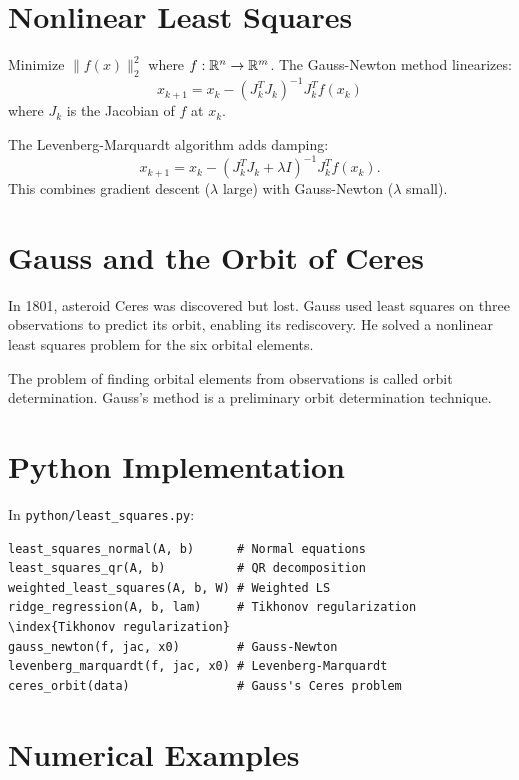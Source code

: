 \section{Nonlinear Least Squares}

Minimize $\|f(x)\|_2^2$ where $f: \mathbb{R}^n \to \mathbb{R}^m$. The Gauss-Newton method  linearizes:
\[
x_{k+1} = x_k - (J_k^T J_k)^{-1} J_k^T f(x_k)
\]
where $J_k$ is the Jacobian of $f$ at $x_k$.

The Levenberg-Marquardt algorithm  adds damping:
\[
x_{k+1} = x_k - (J_k^T J_k + \lambda I)^{-1} J_k^T f(x_k).
\]
This combines gradient descent ($\lambda$ large) with Gauss-Newton ($\lambda$ small).

\section{Gauss and the Orbit of Ceres}

In 1801, asteroid Ceres was discovered but lost. Gauss used least squares on three observations to predict its orbit, enabling its rediscovery. He solved a nonlinear least squares problem for the six orbital elements.

\begin{definition}
The problem of finding orbital elements from observations is called orbit determination. Gauss's method is a preliminary orbit determination technique.
\end{definition}

\section{Python Implementation}

In \texttt{python/least\_squares.py}:

\begin{lstlisting}[style=python, caption={Key functions in python/least\_squares.py}]
least_squares_normal(A, b)      # Normal equations
least_squares_qr(A, b)          # QR decomposition
weighted_least_squares(A, b, W) # Weighted LS
ridge_regression(A, b, lam)     # Tikhonov regularization \index{Tikhonov regularization}
gauss_newton(f, jac, x0)        # Gauss-Newton
levenberg_marquardt(f, jac, x0) # Levenberg-Marquardt
ceres_orbit(data)               # Gauss's Ceres problem
\end{lstlisting}

\section{Numerical Examples}

